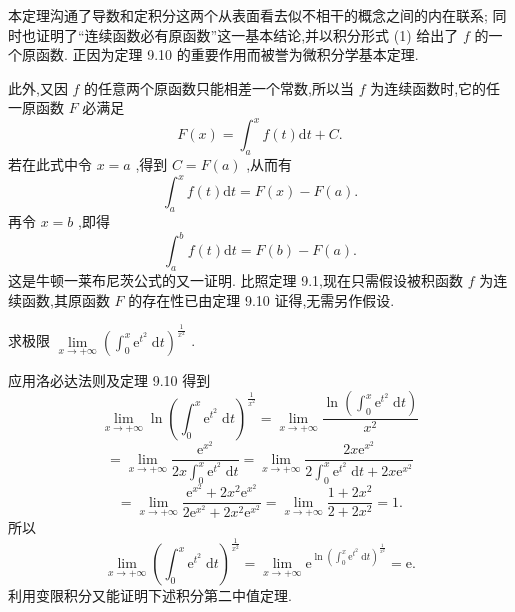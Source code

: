 本定理沟通了导数和定积分这两个从表面看去似不相干的概念之间的内在联系; 同时也证明了“连续函数必有原函数”这一基本结论,并以积分形式 (1) 给出了 \(f\) 的一个原函数. 正因为定理 9.10 的重要作用而被誉为微积分学基本定理.

此外,又因 \(f\) 的任意两个原函数只能相差一个常数,所以当 \(f\) 为连续函数时,它的任一原函数 \(F\) 必满足
\[
F\left( x\right)  = {\int }_{a}^{x}f\left( t\right) \mathrm{d}t + C.
\]
若在此式中令 \(x = a\) ,得到 \(C = F\left( a\right)\) ,从而有
\[
{\int }_{a}^{x}f\left( t\right) \mathrm{d}t = F\left( x\right)  - F\left( a\right) .
\]
再令 \(x = b\) ,即得
\[
{\int }_{a}^{b}f\left( t\right) \mathrm{d}t = F\left( b\right)  - F\left( a\right) . \tag{4}
\]
这是牛顿一莱布尼茨公式的又一证明. 比照定理 9.1,现在只需假设被积函数 \(f\) 为连续函数,其原函数 \(F\) 的存在性已由定理 9.10 证得,无需另作假设.

\begin{example}

\end{example}
求极限 \(\mathop{\lim }\limits_{{x \rightarrow   + \infty }}{\left( {\int }_{0}^{x}{\mathrm{e}}^{{t}^{2}}\mathrm{\;d}t\right) }^{\frac{1}{{x}^{2}}}\) .

\begin{solution}

\end{solution}
应用洛必达法则及定理 9.10 得到
\[
\mathop{\lim }\limits_{{x \rightarrow   + \infty }}\ln {\left( {\int }_{0}^{x}{\mathrm{e}}^{{t}^{2}}\mathrm{\;d}t\right) }^{\frac{1}{{x}^{2}}} = \mathop{\lim }\limits_{{x \rightarrow   + \infty }}\frac{\ln \left( {{\int }_{0}^{x}{\mathrm{e}}^{{t}^{2}}\mathrm{\;d}t}\right) }{{x}^{2}}
\]
\[
= \mathop{\lim }\limits_{{x \rightarrow   + \infty }}\frac{{\mathrm{e}}^{{x}^{2}}}{{2x}{\int }_{0}^{x}{\mathrm{e}}^{{t}^{2}}\mathrm{\;d}t} = \mathop{\lim }\limits_{{x \rightarrow   + \infty }}\frac{{2x}{\mathrm{e}}^{{x}^{2}}}{2{\int }_{0}^{x}{\mathrm{e}}^{{t}^{2}}\mathrm{\;d}t + {2x}{\mathrm{e}}^{{x}^{2}}}
\]
\[
= \mathop{\lim }\limits_{{x \rightarrow   + \infty }}\frac{{\mathrm{e}}^{{x}^{2}} + 2{x}^{2}{\mathrm{e}}^{{x}^{2}}}{2{\mathrm{e}}^{{x}^{2}} + 2{x}^{2}{\mathrm{e}}^{{x}^{2}}} = \mathop{\lim }\limits_{{x \rightarrow   + \infty }}\frac{1 + 2{x}^{2}}{2 + 2{x}^{2}} = 1.
\]
所以
\[
\mathop{\lim }\limits_{{x \rightarrow   + \infty }}{\left( {\int }_{0}^{x}{\mathrm{e}}^{{t}^{2}}\mathrm{\;d}t\right) }^{\frac{1}{{x}^{2}}} = \mathop{\lim }\limits_{{x \rightarrow   + \infty }}{\mathrm{e}}^{\ln {\left( {\int }_{0}^{x}{\mathrm{e}}^{{t}^{2}}\mathrm{\;d}t\right) }^{\frac{1}{{x}^{2}}}} = \mathrm{e}.
\]
利用变限积分又能证明下述积分第二中值定理.

